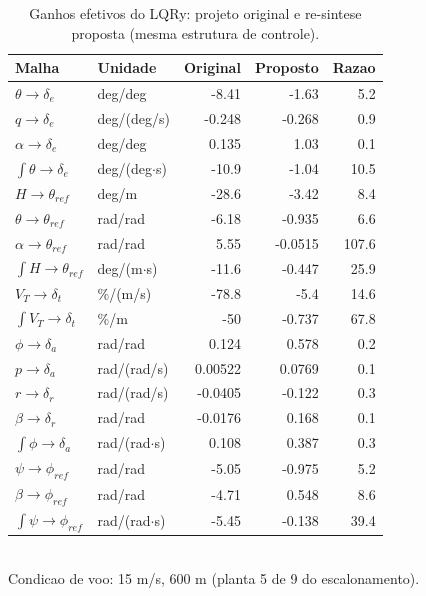 \begin{table}[htbp]
\centering
\caption{Ganhos efetivos do LQRy: projeto original e re-sintese proposta (mesma estrutura de controle).}
\label{tab:ganhos_lqry_orig_v3}
\begin{tabular}{llrrr}
\hline
Malha & Unidade & Original & Proposto & Razao \\
\hline
$\theta \rightarrow \delta_e$ & deg/deg & -8.41 & -1.63 & 5.2 \\
$q \rightarrow \delta_e$ & deg/(deg/s) & -0.248 & -0.268 & 0.9 \\
$\alpha \rightarrow \delta_e$ & deg/deg & 0.135 & 1.03 & 0.1 \\
$\int\theta \rightarrow \delta_e$ & deg/(deg$\cdot$s) & -10.9 & -1.04 & 10.5 \\
$H \rightarrow \theta_{ref}$ & deg/m & -28.6 & -3.42 & 8.4 \\
$\theta \rightarrow \theta_{ref}$ & rad/rad & -6.18 & -0.935 & 6.6 \\
$\alpha \rightarrow \theta_{ref}$ & rad/rad & 5.55 & -0.0515 & 107.6 \\
$\int H \rightarrow \theta_{ref}$ & deg/(m$\cdot$s) & -11.6 & -0.447 & 25.9 \\
$V_T \rightarrow \delta_t$ & \%/(m/s) & -78.8 & -5.4 & 14.6 \\
$\int V_T \rightarrow \delta_t$ & \%/m & -50 & -0.737 & 67.8 \\
$\phi \rightarrow \delta_a$ & rad/rad & 0.124 & 0.578 & 0.2 \\
$p \rightarrow \delta_a$ & rad/(rad/s) & 0.00522 & 0.0769 & 0.1 \\
$r \rightarrow \delta_r$ & rad/(rad/s) & -0.0405 & -0.122 & 0.3 \\
$\beta \rightarrow \delta_r$ & rad/rad & -0.0176 & 0.168 & 0.1 \\
$\int\phi \rightarrow \delta_a$ & rad/(rad$\cdot$s) & 0.108 & 0.387 & 0.3 \\
$\psi \rightarrow \phi_{ref}$ & rad/rad & -5.05 & -0.975 & 5.2 \\
$\beta \rightarrow \phi_{ref}$ & rad/rad & -4.71 & 0.548 & 8.6 \\
$\int\psi \rightarrow \phi_{ref}$ & rad/(rad$\cdot$s) & -5.45 & -0.138 & 39.4 \\
\hline
\end{tabular}
\\[2pt]\footnotesize Condicao de voo: 15 m/s, 600 m (planta 5 de 9 do escalonamento).
\end{table}
